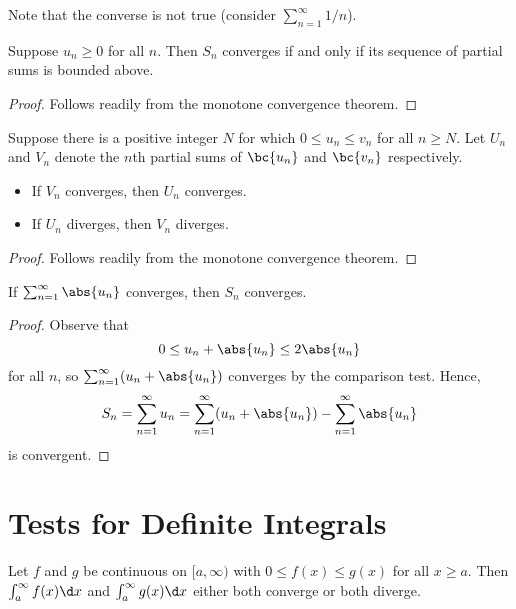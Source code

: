 Note that the converse is not true (consider $\sum_{n = 1}^\infty 1/n$).

\begin{theorem}
    Suppose $u_n \geq 0$ for all $n$. Then $S_n$ converges if and only if its sequence of partial sums is bounded above.
\end{theorem}
\begin{proof}
    Follows readily from the monotone convergence theorem.
\end{proof}

\begin{theorem}
    Suppose there is a positive integer $N$ for which $0 \leq u_n \leq v_n$ for all $n \geq N$. Let $U_n$ and $V_n$ denote the $n$th partial sums of $\bc{u_n}$ and $\bc{v_n}$ respectively.
    \begin{itemize}
        \item If $V_n$ converges, then $U_n$ converges.
        \item If $U_n$ diverges, then $V_n$ diverges.
    \end{itemize}
\end{theorem}
\begin{proof}
    Follows readily from the monotone convergence theorem.
\end{proof}

\begin{theorem}
    If $\sum_{n = 1}^\infty \abs{u_n}$ converges, then $S_n$ converges.
\end{theorem}
\begin{proof}
    Observe that \[0 \leq u_n + \abs{u_n} \leq 2 \abs{u_n}\] for all $n$, so $\sum_{n = 1}^\infty (u_n + \abs{u_n})$ converges by the comparison test. Hence, \[S_n = \sum_{n = 1}^\infty u_n = \sum_{n = 1}^\infty (u_n + \abs{u_n}) - \sum_{n = 1}^\infty \abs{u_n}\] is convergent.
\end{proof}

\section{Tests for Definite Integrals}

\begin{proposition}
    Let $f$ and $g$ be continuous on $[a, \infty)$ with $0 \leq f(x) \leq g(x)$ for all $x \geq a$. Then $\int_a^\infty f(x) \d x$ and $\int_a^\infty g(x) \d x$ either both converge or both diverge.
\end{proposition}

